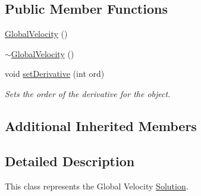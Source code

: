 \subsection*{Public Member Functions}
\begin{DoxyCompactItemize}
\item 
\hyperlink{classosea_1_1ofreq_1_1_global_velocity_a444ab39b351acd4e6ca7dc8088e2a9b8}{Global\-Velocity} ()
\item 
\hyperlink{classosea_1_1ofreq_1_1_global_velocity_a2b8f719180b1786a582d90603db8f2d8}{$\sim$\-Global\-Velocity} ()
\item 
void \hyperlink{classosea_1_1ofreq_1_1_global_velocity_a11229a6dbc7f85f3c321b5eddb127f10}{set\-Derivative} (int ord)
\begin{DoxyCompactList}\small\item\em Sets the order of the derivative for the object. \end{DoxyCompactList}\end{DoxyCompactItemize}
\subsection*{Additional Inherited Members}


\subsection{Detailed Description}
This class represents the Global Velocity \hyperlink{classosea_1_1ofreq_1_1_solution}{Solution}. 

